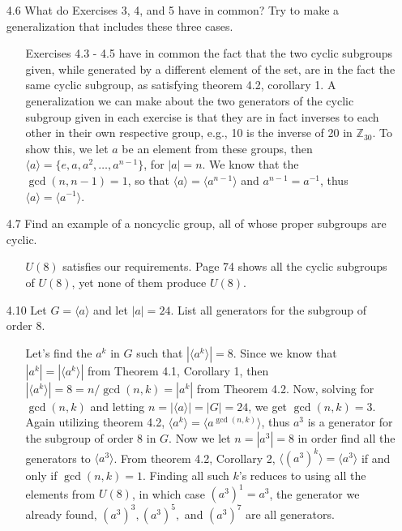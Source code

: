 \documentclass[12pt]{article}
\begin{document}
\begin{enumerate}
\item[4.6] What do Exercises 3, 4, and 5 have in common? Try to make a generalization
that includes these three cases.
\begin{enumerate}
\item[] Exercises 4.3 - 4.5 have in common the fact that the two cyclic subgroups given, while
generated by a different element of the set, are in the fact the same cyclic subgroup, as 
satisfying theorem 4.2, corollary 1. A generalization we can make about the two 
generators of the cyclic subgroup given in each exercise is that they are in fact inverses 
to each other in their own respective group, e.g., 10 is the inverse of 20 in $\mathbb{Z}_{30}$.
To show this, we let $a$ be an element from these groups, then $\langle a\rangle = 
\{e, a, a^2, \ldots, a^{n-1}\}$, for $|a| = n$. We know that the $\gcd(n, n-1) = 1$, so
that $\langle a\rangle = \langle a^{n-1}\rangle$ and $a^{n-1} = a^{-1}$, thus
$\langle a\rangle = \langle a^{-1}\rangle$.
\end{enumerate}

\item[4.7] Find an example of a noncyclic group, all of whose proper subgroups are cyclic.
\begin{enumerate}
\item[] $U(8)$ satisfies our requirements. Page 74 shows all the cyclic subgroups of $U(8)$, 
yet none of them produce $U(8)$.
\end{enumerate}

\item[4.10] Let $G = \langle a \rangle$ and let $|a| = 24$. List all generators for the subgroup
of order 8.
\begin{enumerate}
\item[] Let's find the $a^k$ in $G$ such that $| \langle a^k\rangle| = 8$. Since we know that 
$|a^k| = | \langle a^k\rangle|$ from Theorem 4.1, Corollary 1, then 
$| \langle a^k\rangle| = 8 = n/\gcd(n, k) = |a^k|$ from Theorem 4.2.
Now, solving for $\gcd(n, k)$ and letting $n = | \langle a\rangle| = |G| = 24$, 
we get $\gcd(n, k) = 3$. Again utilizing theorem 4.2, $\langle a^k \rangle = 
\langle a^{\gcd(n, k)}\rangle$, thus $a^3$ is a generator for the subgroup of
order 8 in $G$. Now we let $n = |a^3| = 8$ in order find all the generators 
to $\langle a^3\rangle$. From theorem 4.2, Corollary 2, $\langle (a^3)^k\rangle = 
\langle a^3\rangle$ if and only if $\gcd(n, k) = 1$. Finding all such $k$'s reduces
to using all the elements from $U(8)$, in which case $(a^3)^1 = a^3$, the 
generator we already found, $(a^3)^3, (a^3)^5,$ and $(a^3)^7$ are all generators.
\end{enumerate}


\end{enumerate}
\end{document}
